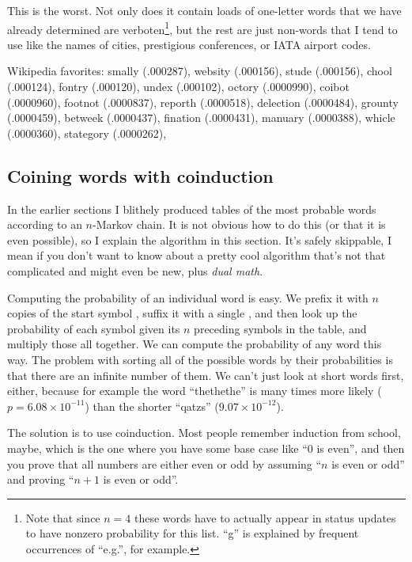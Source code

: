 \documentclass[twocolumn]{article}
\begin{document}
This is the worst. Not only does it contain loads of one-letter words that
we have already determined are verboten\footnote{Note that since $n=4$ these
words have to actually appear in status updates to have nonzero probability for
this list. ``g'' is explained by frequent occurrences of ``e.g.'', for example.},
but the rest are just non-words that I tend to use like the names of cities,
prestigious conferences, or IATA airport codes.








Wikipedia favorites: smally (.000287),
websity (.000156),
stude (.000156),
chool (.000124),
fontry (.000120),
undex (.000102),
octory (.0000990),
coibot (.0000960),
footnot (.0000837),
reporth (.0000518),
delection (.0000484),
grounty (.0000459),
betweek (.0000437),
fination (.0000431),
manuary (.0000388),
whicle (.0000360),
stategory (.0000262),


\subsection{Coining words with coinduction} \label{sec:coin}

In the earlier sections I blithely produced tables of the most
probable words according to an $n$-Markov chain. It is not obvious how
to do this (or that it is even possible), so I explain the algorithm
in this section. It's safely skippable, I mean if you don't want to
know about a pretty cool algorithm that's not that complicated and
might even be new, plus {\em dual math}.

Computing the probability of an individual word is easy. We prefix it
with $n$ copies of the start symbol \<, suffix it with a single \>,
and then look up the probability of each symbol given its $n$
preceding symbols in the table, and multiply those all together. We
can compute the probability of any word this way. The problem with
sorting all of the possible words by their probabilities is that there
are an infinite number of them. We can't just look at short words
first, either, because for example the word ``thethethe'' is many
times more likely ($p = 6.08\times 10^{-11}$) than the shorter
``qatzs'' ($9.07\times 10^{-12}$).

The solution is to use coinduction. Most people remember induction
from school, maybe, which is the one where you have some base case
like ``0 is even'', and then you prove that all numbers are either
even or odd by assuming ``$n$ is even or odd'' and proving ``$n + 1$
is even or odd''. 
\end{document}
